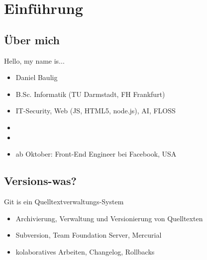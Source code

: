 \newcommand{\command}[1]{\texttt{#1}}
\newcommand{\variable}[1]{\textit{#1}}



\frame{
    \titlepage
}


\section{Einführung}
\subsection{Über mich}

\begin{frame}{Hello, my name is...}
    \begin{itemize}
        \item<1-> Daniel Baulig
        \item<2-> B.Sc. Informatik (TU Darmstadt, FH Frankfurt)
        \item<3-> IT-Security, Web (JS, HTML5, node.js), AI, FLOSS
        \item<4-> 
        \item<5-> 
        \item<7-> ab Oktober: Front-End Engineer bei Facebook, USA
    \end{itemize}
    
\end{frame}

\subsection{Versions-was?}

\begin{frame}{Git is ein Quelltextverwaltungs-System}
    \begin{itemize}[<+->]
        \item Archivierung, Verwaltung und Versionierung von Quelltexten
        \item Subversion, Team Foundation Server, Mercurial
        \item kolaboratives Arbeiten, Changelog, Rollbacks
    \end{itemize}
\end{frame}

